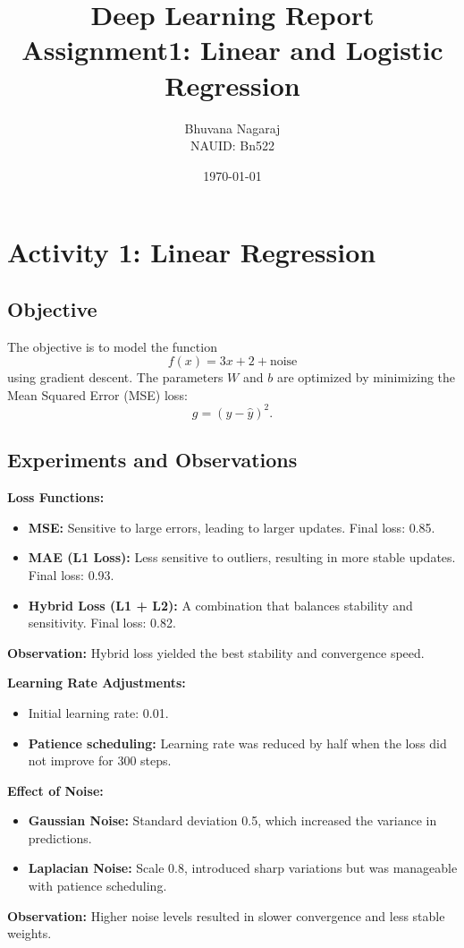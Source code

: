 \documentclass[11pt]{article}
\title{Deep Learning Report\\
\large Assignment1: Linear and Logistic Regression}
\author{Bhuvana Nagaraj \\ NAUID: Bn522}
\date{\today}
\begin{document}
\maketitle

\section{Activity 1: Linear Regression}

\subsection{Objective}
The objective is to model the function
\[
f(x)=3x+2+\text{noise}
\]
using gradient descent. The parameters \(W\) and \(b\) are optimized by minimizing the Mean Squared Error (MSE) loss:
\[
g=(y-\hat{y})^2.
\]

\subsection{Experiments and Observations}

\textbf{Loss Functions:}
\begin{itemize}
    \item \textbf{MSE:} Sensitive to large errors, leading to larger updates. Final loss: 0.85.
    \item \textbf{MAE (L1 Loss):} Less sensitive to outliers, resulting in more stable updates. Final loss: 0.93.
    \item \textbf{Hybrid Loss (L1 + L2):} A combination that balances stability and sensitivity. Final loss: 0.82.
\end{itemize}
\textbf{Observation:} Hybrid loss yielded the best stability and convergence speed.

\textbf{Learning Rate Adjustments:}
\begin{itemize}
    \item Initial learning rate: 0.01.
    \item \textbf{Patience scheduling:} Learning rate was reduced by half when the loss did not improve for 300 steps.
\end{itemize}

\textbf{Effect of Noise:}
\begin{itemize}
    \item \textbf{Gaussian Noise:} Standard deviation 0.5, which increased the variance in predictions.
    \item \textbf{Laplacian Noise:} Scale 0.8, introduced sharp variations but was manageable with patience scheduling.
\end{itemize}
\textbf{Observation:} Higher noise levels resulted in slower convergence and less stable weights.
\end{document}
